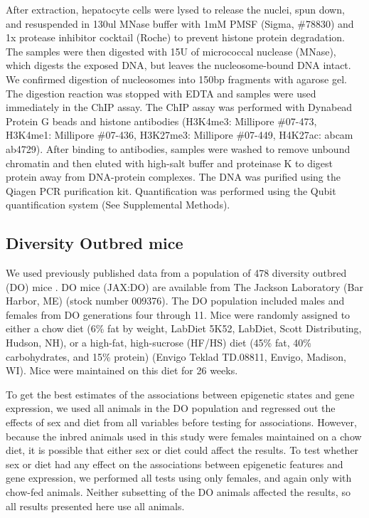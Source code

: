 \documentclass[
  11pt,
]{article}
\begin{document}
After extraction, hepatocyte cells were lysed to release the nuclei,
spun down, and resuspended in 130ul MNase buffer with 1mM PMSF (Sigma,
\#78830) and 1x protease inhibitor cocktail (Roche) to prevent histone
protein degradation. The samples were then digested with 15U of
micrococcal nuclease (MNase), which digests the exposed DNA, but leaves
the nucleosome-bound DNA intact. We confirmed digestion of nucleosomes
into 150bp fragments with agarose gel. The digestion reaction was
stopped with EDTA and samples were used immediately in the ChIP assay.
The ChIP assay was performed with Dynabead Protein G beads and histone
antibodies (H3K4me3: Millipore \#07-473, H3K4me1: Millipore \#07-436,
H3K27me3: Millipore \#07-449, H4K27ac: abcam ab4729). After binding to
antibodies, samples were washed to remove unbound chromatin and then
eluted with high-salt buffer and proteinase K to digest protein away
from DNA-protein complexes. The DNA was purified using the Qiagen PCR
purification kit. Quantification was performed using the Qubit
quantification system (See Supplemental Methods).

\hypertarget{diversity-outbred-mice}{%
\subsection{Diversity Outbred mice}\label{diversity-outbred-mice}}

We used previously published data from a population of 478 diversity
outbred (DO) mice \citep{Svenson:2012hq}. DO mice (JAX:DO) are available
from The Jackson Laboratory (Bar Harbor, ME) (stock number 009376). The
DO population included males and females from DO generations four
through 11. Mice were randomly assigned to either a chow diet (6\% fat
by weight, LabDiet 5K52, LabDiet, Scott Distributing, Hudson, NH), or a
high-fat, high-sucrose (HF/HS) diet (45\% fat, 40\% carbohydrates, and
15\% protein) (Envigo Teklad TD.08811, Envigo, Madison, WI). Mice were
maintained on this diet for 26 weeks.

To get the best estimates of the associations between epigenetic states
and gene expression, we used all animals in the DO population and
regressed out the effects of sex and diet from all variables before
testing for associations. However, because the inbred animals used in
this study were females maintained on a chow diet, it is possible that
either sex or diet could affect the results. To test whether sex or diet
had any effect on the associations between epigenetic features and gene
expression, we performed all tests using only females, and again only
with chow-fed animals. Neither subsetting of the DO animals affected the
results, so all results presented here use all animals.
\end{document}
